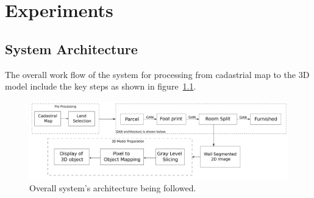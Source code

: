     \chapter{Experiments}
        \section{System Architecture}
            The overall work flow of the system for processing from cadastrial map to the 3D model include the key steps as shown in figure~\ref{fig:overall-architecture}.
            \begin{figure}[h]                 
                \centering                 
                \includegraphics[width=1\textwidth]{img/experiment/overall_architecture.png}                 
                \caption{Overall system's architecture being followed.}                 
                \label{fig:overall-architecture}         
            \end{figure}
            \break
